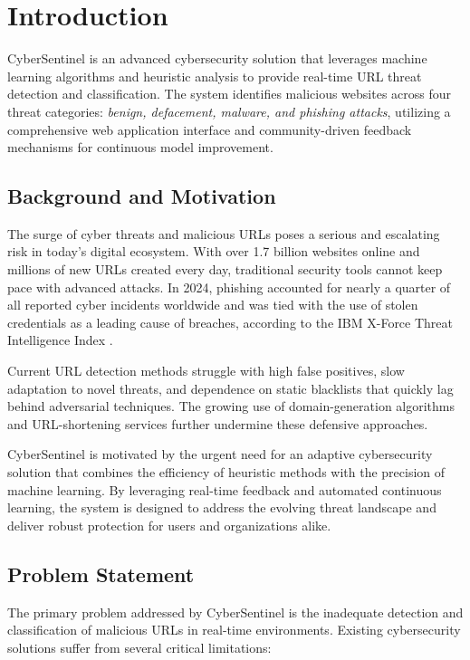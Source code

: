\chapter{Introduction}

CyberSentinel is an advanced cybersecurity solution that leverages machine learning algorithms and heuristic analysis to provide real-time URL threat detection and classification. The system identifies malicious websites across four threat categories: \textit{benign, defacement, malware, and phishing attacks}, utilizing a comprehensive web application interface and community-driven feedback mechanisms for continuous model improvement.

\section{Background and Motivation}

The surge of cyber threats and malicious URLs poses a serious and escalating risk in today’s digital ecosystem. With over 1.7 billion websites online and millions of new URLs created every day, traditional security tools cannot keep pace with advanced attacks. In 2024, phishing accounted for nearly a quarter of all reported cyber incidents worldwide and was tied with the use of stolen credentials as a leading cause of breaches, according to the IBM X-Force Threat Intelligence Index \cite{ibm2024}.

Current URL detection methods struggle with high false positives, slow adaptation to novel threats, and dependence on static blacklists that quickly lag behind adversarial techniques. The growing use of domain-generation algorithms and URL-shortening services further undermine these defensive approaches.

CyberSentinel is motivated by the urgent need for an adaptive cybersecurity solution that combines the efficiency of heuristic methods with the precision of machine learning. By leveraging real-time feedback and automated continuous learning, the system is designed to address the evolving threat landscape and deliver robust protection for users and organizations alike.

\section{Problem Statement}

The primary problem addressed by CyberSentinel is the inadequate detection and classification of malicious URLs in real-time environments. Existing cybersecurity solutions suffer from several critical limitations:

